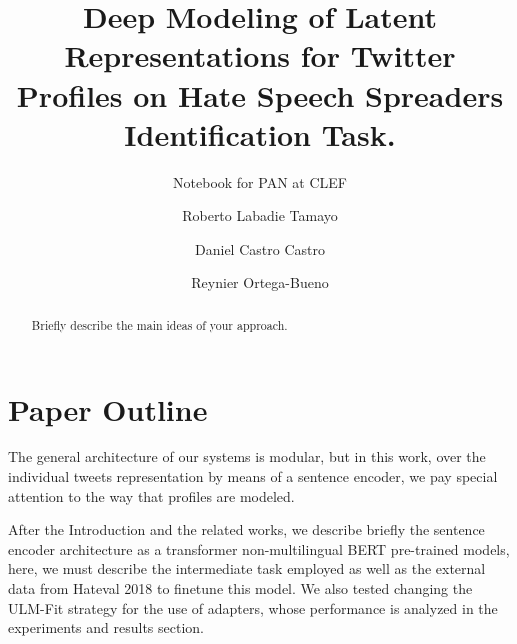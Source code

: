 \documentclass{llncs}
\begin{document}
	

\title{Deep Modeling of Latent Representations for Twitter Profiles on Hate Speech Spreaders Identification Task.}
\subtitle{Notebook for PAN at CLEF \the\year}

\author{Roberto Labadie Tamayo \and Daniel Castro Castro \and Reynier Ortega-Bueno }

\maketitle

\begin{abstract}
Briefly describe the main ideas of your approach.
\end{abstract}

\section{Paper Outline}
	
	The general architecture of our systems is modular, but in this work, over the individual tweets representation by means of a sentence encoder, we pay special attention to the way that profiles are modeled. 

After the Introduction and the related works, we describe briefly the sentence encoder architecture as a transformer non-multilingual BERT pre-trained models, here, we must describe the intermediate task employed as well as the external data from Hateval 2018 to finetune this model. We also tested changing the ULM-Fit strategy for the use of adapters, whose performance is analyzed in the experiments and results section. \\\\
\end{document}
